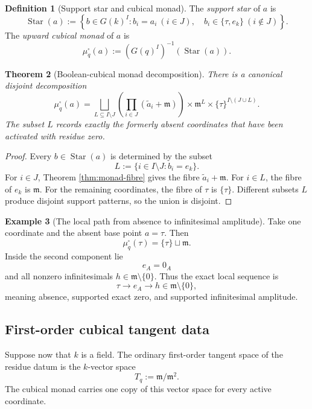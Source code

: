 \documentclass[11pt]{amsart}
\numberwithin{equation}{section}
\newtheorem{theorem}{Theorem}[section]
\theoremstyle{definition}
\newtheorem{definition}[theorem]{Definition}
\newtheorem{example}[theorem]{Example}
\begin{document}
\begin{definition}[Support star and cubical monad]\label{def:cubical-monad}
The \emph{support star} of $a$ is
\[
\operatorname{Star}(a)
:=
\left\{
 b\in G(k)^I:
 b_i=a_i\ (i\in J),
\quad
b_i\in\{\tau,e_k\}\ (i\notin J)
\right\}.
\]
The \emph{upward cubical monad} of $a$ is
\[
\mu_q^\square(a)
:=
(G(q)^I)^{-1}(\operatorname{Star}(a)).
\]
\end{definition}

\begin{theorem}[Boolean-cubical monad decomposition]\label{thm:cubical-monad}
There is a canonical disjoint decomposition
\[
\boxed{
\mu_q^\square(a)
=
\bigsqcup_{L\subseteq I\setminus J}
\left(
\prod_{i\in J}(\widetilde a_i+\mathfrak m)
\right)
\times
\mathfrak m^L
\times
\{\tau\}^{I\setminus(J\cup L)}.}
\]
The subset $L$ records exactly the formerly absent coordinates that have been activated with residue zero.
\end{theorem}

\begin{proof}
Every $b\in\operatorname{Star}(a)$ is determined by the subset
\[
L:=\{i\in I\setminus J:b_i=e_k\}.
\]
For $i\in J$, Theorem \ref{thm:monad-fibre} gives the fibre $\widetilde a_i+\mathfrak m$.  For $i\in L$, the fibre of $e_k$ is $\mathfrak m$.  For the remaining coordinates, the fibre of $\tau$ is $\{\tau\}$.  Different subsets $L$ produce disjoint support patterns, so the union is disjoint.
\end{proof}

\begin{example}[The local path from absence to infinitesimal amplitude]
Take one coordinate and the absent base point $a=\tau$.  Then
\[
\mu_q^\square(\tau)
=
\{\tau\}\sqcup\mathfrak m.
\]
Inside the second component lie
\[
e_A=0_A
\]
and all nonzero infinitesimals $h\in\mathfrak m\setminus\{0\}$.  Thus the exact local sequence is
\[
\tau
\longrightarrow
 e_A
\longrightarrow
 h\in\mathfrak m\setminus\{0\},
\]
meaning absence, supported exact zero, and supported infinitesimal amplitude.
\end{example}

\subsection{First-order cubical tangent data}

Suppose now that $k$ is a field.  The ordinary first-order tangent space of the residue datum is the $k$-vector space
\[
T_q:=\mathfrak m/\mathfrak m^2.
\]
The cubical monad carries one copy of this vector space for every active coordinate.
\end{document}
